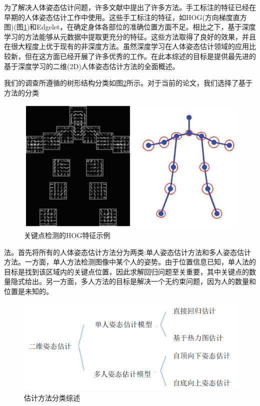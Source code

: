 \documentclass[hyperref]{ctexart}
\begin{document}
\begin{multicols}{2}
		为了解决人体姿态估计问题，许多文献中提出了许多方法。手工标注的特征已经在早期的人体姿态估计工作中使用。这些手工标注的特征，如HOG(方向梯度直方图)\cite{yang2011articulated}\cite{yang2012articulated}\cite{wang2013beyond}\cite{6126309}\cite{eichner20122d}(图\ref{c})和Edgelet\cite{eichner2010we}，在确定身体各部位的准确位置方面不足。相比之下，基于深度学习的方法能够从元数据中提取更充分的特征。这些方法取得了良好的效果，并且在很大程度上优于现有的非深度方法。虽然深度学习在人体姿态估计领域的应用比较新，但在这方面已经开展了许多优秀的工作。在此本综述的目标是提供最先进的基于深度学习的二维(2D)人体姿态估计方法的全面概述。
		
		我们的调查所遵循的树形结构分类如图\ref{d}所示。对于当前的论文，我们选择了基于方法的分类
		\begin{figure}[H]
			\centering
			\includegraphics[scale = 0.3]{3}
			\caption{关键点检测的HOG特征示例}
			\label{c}
		\end{figure}
		\noindent 法。首先将所有的人体姿态估计方法分为两类:单人姿态估计方法和多人姿态估计方法。一方面，单人方法检测图像中某个人的姿势。由于位置信息已知，单人法的目标是找到该区域内的关键点位置，因此求解回归问题至关重要，其中关键点的数量隐式给出。另一方面，多人方法的目标是解决一个无约束问题，因为人的数量和位置是未知的。
		
		\begin{figure}[H]
			\centering
			\includegraphics[scale = 0.25]{4}
			\caption{估计方法分类综述}
			\label{d}
		\end{figure}
		

\end{multicols}
\end{document}
